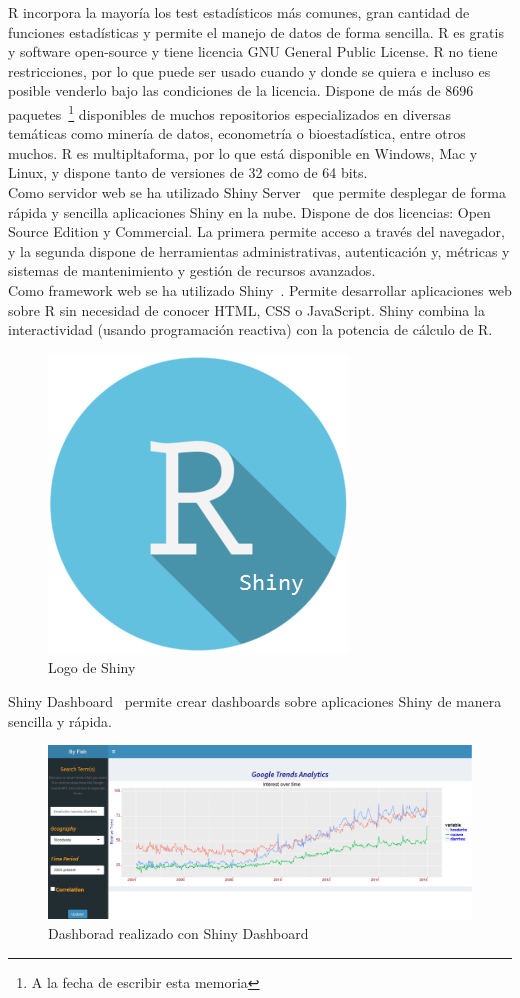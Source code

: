 R incorpora la mayoría los test estadísticos más comunes, gran cantidad de funciones estadísticas y permite el manejo de datos de forma sencilla. R es gratis y software open-source y tiene licencia GNU General Public License. R no tiene restricciones, por lo que puede ser usado cuando y donde se quiera e incluso es posible venderlo bajo las condiciones de la licencia. Dispone de más de 8696 paquetes~\cite{Rpaquetes}\footnote{A la fecha de escribir esta memoria} disponibles de muchos repositorios especializados en diversas temáticas como minería de datos, econometría o bioestadística, entre otros muchos. R es multipltaforma, por lo que está disponible en Windows, Mac y Linux, y dispone tanto de versiones de 32 como de 64 bits.\\

Como servidor web se ha utilizado Shiny Server~\cite{ShinyServer} que permite desplegar de forma rápida y sencilla aplicaciones Shiny en la nube. Dispone de dos licencias: Open Source Edition y Commercial. La primera permite acceso a través del navegador, y la segunda dispone de herramientas administrativas, autenticación y, métricas y sistemas de mantenimiento y gestión de recursos avanzados.\\

Como framework web se ha utilizado Shiny~\cite{Shiny}. Permite desarrollar aplicaciones web sobre R sin necesidad de conocer HTML, CSS o JavaScript. Shiny combina la interactividad (usando programación reactiva) con la potencia de cálculo de R.\\

\begin{figure}[htbp!]
	\centering
	\includegraphics[width=0.3\linewidth]{imagenes/RShiny}
	\caption{Logo de Shiny}
	\label{fig:RShiny}
\end{figure}

Shiny Dashboard~\cite{ShinyDashboard} permite crear dashboards sobre aplicaciones Shiny de manera sencilla y rápida.\\

\begin{figure}
\centering
\includegraphics[width=0.7\linewidth]{imagenes/shinydashboard}
\caption{Dashborad realizado con Shiny Dashboard}
\label{fig:shinydashboard}
\end{figure}

